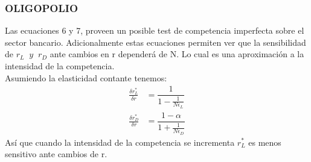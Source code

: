 \documentclass[10pt, xcolor=table, x11names]{beamer}
\begin{document}
\begin{frame}
    \frametitle{{\normalsize OLIGOPOLIO} {}}
    Las ecuaciones 6 y 7, proveen un posible test de competencia imperfecta sobre el sector bancario. Adicionalmente estas ecuaciones permiten ver que la sensibilidad de $r_{L}\; \; y \; \; r_{D}$ ante cambios en r dependerá de N. Lo cual es una aproximación a la intensidad de la competencia.\\
    Asumiendo la elasticidad contante tenemos:
 \begin{align}
 \frac{\delta r_{L}^{*}}{\delta r}&= \dfrac{1}{1-\frac{1}{N \epsilon_{L}}}\nonumber \\
 \frac{\delta r_{D}^{*}}{\delta r} &=\dfrac{1-\alpha}{1+\frac{1}{N \epsilon_{D}}}\nonumber 
 \end{align} 
   Así que cuando la intensidad de la competencia se incrementa $r_{L}^{*}$ es menos sensitivo ante cambios de r.
\end{frame}
\end{document}
